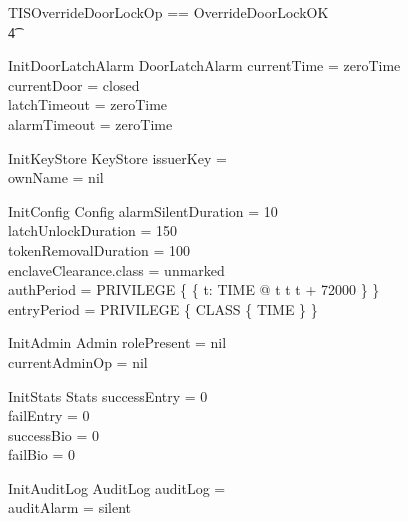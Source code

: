 \begin{zed}
        TISOverrideDoorLockOp == OverrideDoorLockOK
\\ \t4  \lor
        [~ BadAdminLogout | enclaveStatus = waitingStartAdminOp 
\\ \t6  \land the~ currentAdminOp = overrideLock     ~]
\end{zed}

\begin{schema}{InitDoorLatchAlarm}
        DoorLatchAlarm
\where
	currentTime = zeroTime
\\	currentDoor = closed
\\	latchTimeout = zeroTime
\\	alarmTimeout = zeroTime
\end{schema}

\begin{schema}{InitKeyStore}
        KeyStore
\where
        issuerKey = \emptyset
\\      ownName = nil
\end{schema}

\begin{schema}{InitConfig}
        Config
\where
	alarmSilentDuration = 10
\\      latchUnlockDuration = 150
\\      tokenRemovalDuration = 100
\\      enclaveClearance.class = unmarked
\\      authPeriod = PRIVILEGE \cross \{ \{ t: TIME @ t \mapsto t \upto t
+ 72000 \} \}
\\      entryPeriod = PRIVILEGE \cross \{ CLASS \cross \{ TIME \} \}
\end{schema}

\begin{schema}{InitAdmin}
        Admin
\where
        rolePresent = nil
\\      currentAdminOp = nil
\end{schema}

\begin{schema}{InitStats}
        Stats
\where
        successEntry = 0
\\      failEntry = 0
\\      successBio = 0
\\      failBio = 0
\end{schema}        

\begin{schema}{InitAuditLog}
        AuditLog
\where
        auditLog = \emptyset
\\      auditAlarm = silent
\end{schema}        

